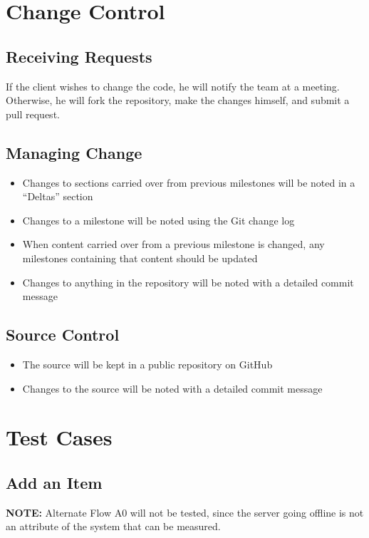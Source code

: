 \documentclass{article}
\begin{document}
\section{Change Control}

\subsection{Receiving Requests}
If the client wishes to change the code, he will notify the team at a meeting.  Otherwise, he will fork the repository, make the changes himself, and submit a pull request.

\subsection{Managing Change}
\begin{itemize}
\item Changes to sections carried over from previous milestones will be noted in a ``Deltas'' section
\item Changes to a milestone will be noted using the Git change log
\item When content carried over from a previous milestone is changed, any milestones containing that content should be updated
\item Changes to anything in the repository will be noted with a detailed commit message
\end{itemize}

\subsection{Source Control}
\begin{itemize}
\item The source will be kept in a public repository on GitHub
\item Changes to the source will be noted with a detailed commit message
\end{itemize}

\section{Test Cases}

\subsection{Add an Item}
\textbf{NOTE:} Alternate Flow A0 will not be tested, since the server going offline is not an attribute of the system that can be measured.
\end{document}
